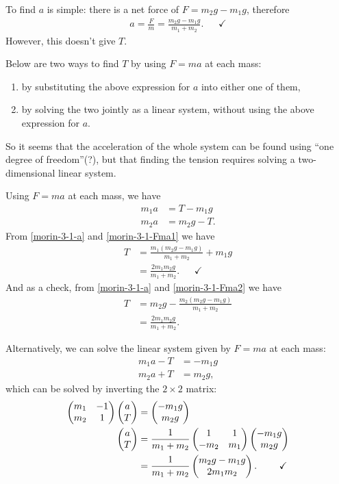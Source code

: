 To find $a$ is simple: there is a net force of $F = m_2g - m_1g$, therefore
\begin{align}
  a = \frac{F}{m} = \frac{m_2g - m_1g}{m_1 + m_2}. \label{morin-3-1-a} ~~~~~~~\checkmark
\end{align}
However, this doesn't give $T$.

Below are two ways to find $T$ by using $F = ma$ at each mass:
\begin{enumerate}
\item by substituting the above expression for $a$ into either one of them,
\item by solving the two jointly as a linear system, without using the above expression for $a$.
\end{enumerate}

So it seems that the acceleration of the whole system can be found using ``one degree of
freedom''(?), but that finding the tension requires solving a two-dimensional linear system.

Using $F = ma$ at each mass, we have
\begin{align}
  m_1a &= T-m_1g   \label{morin-3-1-Fma1}\\
  m_2a &= m_2g - T \label{morin-3-1-Fma2}.
\end{align}
From \eqref{morin-3-1-a} and \eqref{morin-3-1-Fma1} we have
\begin{align*}
  T &= \frac{m_1(m_2g - m_1g)}{m_1 + m_2} + m_1g \\
    &= \frac{2m_1m_2g}{m_1 + m_2}. ~~~~~~~\checkmark
\end{align*}
And as a check, from \eqref{morin-3-1-a} and \eqref{morin-3-1-Fma2} we have
\begin{align*}
  T &= m_2g - \frac{m_2(m_2g - m_1g)}{m_1 + m_2} \\
    &= \frac{2m_1m_2g}{m_1 + m_2}.
\end{align*}

Alternatively, we can solve the linear system given by $F = ma$ at each mass:
\begin{align*}
  m_1a - T &= -m_1g \\
  m_2a + T &= m_2g,
\end{align*}
which can be solved by inverting the $2 \times 2$ matrix:
\begin{align*}
  \begin{pmatrix}m_1 & -1\\m_2 & 1\\ \end{pmatrix} \begin{pmatrix}a\\T\end{pmatrix} &= \begin{pmatrix}-m_1g\\m_2g\end{pmatrix} \\
  \begin{pmatrix}a\\T\end{pmatrix}              &= \frac{1}{m_1 + m_2} \begin{pmatrix}1 & 1\\-m_2 & m_1\\ \end{pmatrix} \begin{pmatrix}-m_1g\\m_2g\end{pmatrix} \\
                            &= \frac{1}{m_1 + m_2} \begin{pmatrix}m_2g - m_1g\\2m_1m_2\end{pmatrix}. ~~~~~~~\checkmark
\end{align*}

